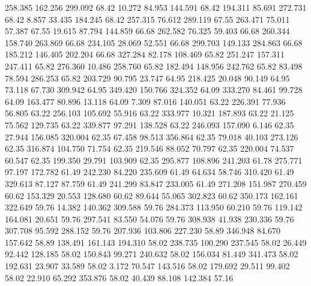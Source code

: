  258.385  162.256  299.092        68.42
  10.272   84.953  144.591        68.42
 194.311   85.691  272.731        68.42
   8.857   33.435  184.245        68.42
 257.315   76.612  289.119        67.55
 263.471   75.011   57.387        67.55
  19.615   87.794  144.859        66.68
 262.582   76.325   59.403        66.68
 260.344  158.740  263.869        66.68
 234.105   28.069   52.551        66.68
 299.703  149.133  284.863        66.68
 185.212  146.405  202.204        66.68
 327.284   82.178  108.469        65.82
 251.247  157.311  247.411        65.82
 276.360   10.486  258.760        65.82
 182.494  148.956  242.762        65.82
  83.498   78.594  286.253        65.82
 203.729   90.795   23.747        64.95
 218.425   20.048   90.149        64.95
  73.118   67.730  309.942        64.95
 349.420  150.766  324.352        64.09
 333.270   84.461   99.728        64.09
 163.477   80.896   13.118        64.09
   7.309   87.016  140.051        63.22
 226.391   77.936   56.805        63.22
 256.103  105.692   55.916        63.22
 333.977   10.321  187.893        63.22
  21.125   75.562  129.735        63.22
 339.877   97.291  138.528        63.22
 246.093  157.090    6.146        62.35
  27.944  156.085  320.004        62.35
  67.458   98.513  356.864        62.35
  79.018   40.103  273.126        62.35
 316.874  104.750   71.754        62.35
 219.546   88.052   70.797        62.35
 220.004   74.537   60.547        62.35
 199.350   29.791  103.909        62.35
 295.877  108.896  241.203        61.78
 275.771   97.197  172.782        61.49
 242.230   84.220  235.609        61.49
  64.634   58.746  310.420        61.49
 329.613   87.127   87.759        61.49
 241.299   83.847  233.005        61.49
 271.208  151.987  270.459        60.62
 153.329   20.553  128.680        60.62
  89.644   55.065  302.823        60.62
 350.173  162.161  322.649        59.76
  14.382  140.362  309.588        59.76
 284.373  113.950   60.210        59.76
 119.142  164.081   20.651        59.76
 297.541   83.550   54.076        59.76
 308.938   41.938  230.336        59.76
 307.708   95.592  288.152        59.76
 207.936  103.806  227.230        58.89
 346.948   84.670  157.642        58.89
 138.491  161.143  194.310        58.02
 238.735  100.290  237.545        58.02
  26.449   92.442  128.185        58.02
 150.843   99.271  240.632        58.02
 156.034   81.449  341.473        58.02
 192.631   23.907   33.589        58.02
   3.172   70.547  143.516        58.02
 179.692   29.511   99.402        58.02
  22.910   65.292  353.876        58.02
  40.439   88.108  142.384        57.16
